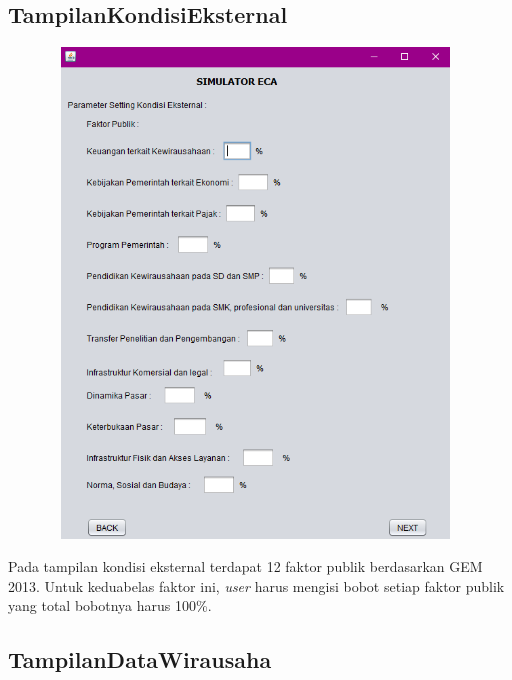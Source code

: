 \subsection{TampilanKondisiEksternal}

\begin{figure} [H]
	\centering  
	\includegraphics[width=11cm, height=13cm]{tampilanKondisiEksternal} 
	\label{fig:kondisiEksternal} 
\end{figure}

Pada tampilan kondisi eksternal terdapat 12 faktor publik berdasarkan GEM 2013. Untuk keduabelas faktor ini, \textit{user} harus mengisi bobot setiap faktor publik yang total bobotnya harus 100\%. 

\subsection{TampilanDataWirausaha}

